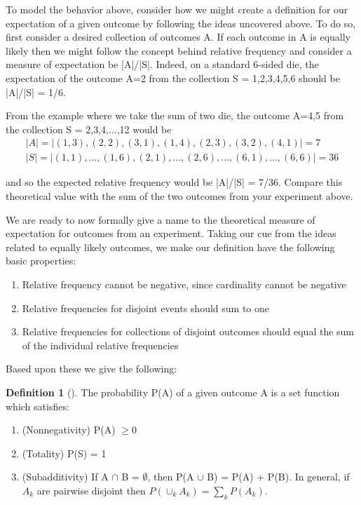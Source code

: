 \documentclass[10pt,]{book}
\theoremstyle{plain}
\theoremstyle{definition}
\newtheorem{definition}[theorem]{Definition}
\theoremstyle{definition}
\theoremstyle{definition}
\numberwithin{equation}{section}
\begin{document}
	To model the behavior above, consider how we might create a definition for our expectation
	of a given outcome by following the ideas uncovered above. To do so, first consider a desired collection
	of outcomes A. If each outcome in A is equally likely then we might follow the concept behind relative 
	frequency and consider a measure of expectation be |A|/|S|. Indeed, on a standard 
	6-sided die, the expectation of the outcome A={2} from the collection S = {1,2,3,4,5,6} should be
	|A|/|S| = 1/6.%
\par
From the example where we take the sum of two die, the outcome A={4,5} from the
	collection S = {2,3,4,...,12} would be%
\begin{gather*}
|A| = | {(1,3),(2,2),(3,1),(1,4),(2,3),(3,2),(4,1)}| = 7\\
|S| = | {(1,1),...,(1,6),(2,1),...,(2,6),...,(6,1),...,(6,6)}| = 36
\end{gather*}\par
and so the expected relative frequency would be |A|/|S| = 7/36. Compare this theoretical value
	with the sum of the two outcomes from your experiment above.%
\par
We are ready to now formally give a name to the theoretical measure of expectation for
	outcomes from an experiment. Taking our cue from the ideas related to equally likely outcomes, we 
	make our definition have the following basic properties:%
\leavevmode%
\begin{enumerate}
\item\hypertarget{li-134}{}Relative frequency cannot be negative, since cardinality cannot be negative%
\item\hypertarget{li-135}{}Relative frequencies for disjoint events should sum to one%
\item\hypertarget{li-136}{}Relative frequencies for collections of disjoint outcomes should equal the sum of the
	individual relative frequencies%
\end{enumerate}
\par
Based upon these we give the following:%
\begin{definition}[{}]\label{DefnProb}
The probability P(A) of a given outcome A is a set function which satisfies:
		\leavevmode%
\begin{enumerate}
\item\hypertarget{li-137}{}(Nonnegativity) P(A) \(\ge 0\)%
\item\hypertarget{li-138}{}(Totality) P(S) = 1%
\item\hypertarget{li-139}{}(Subadditivity) If A \(\cap\) B = \(\emptyset\), then P(A \(\cup\) B) = P(A) + P(B).  
			In general, if {\(A_k\)} are pairwise disjoint then \(P( \cup_k A_k) = \sum_k P(A_k)\).%
\end{enumerate}
\end{definition}
\end{document}
